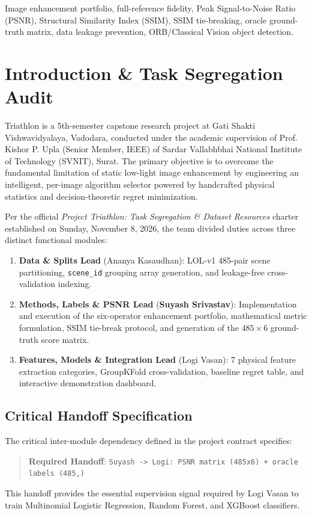 \documentclass[journal]{IEEEtran}
\begin{document}
\begin{IEEEkeywords}
Image enhancement portfolio, full-reference fidelity, Peak Signal-to-Noise Ratio (PSNR), Structural Similarity Index (SSIM), SSIM tie-breaking, oracle ground-truth matrix, data leakage prevention, ORB/Classical Vision object detection.
\end{IEEEkeywords}

\section{Introduction \& Task Segregation Audit}
 Triathlon is a 5th-semester capstone research project at Gati Shakti Vishwavidyalaya, Vadodara, conducted under the academic supervision of Prof. Kishor P. Upla (Senior Member, IEEE) of Sardar Vallabhbhai National Institute of Technology (SVNIT), Surat. The primary objective is to overcome the fundamental limitation of static low-light image enhancement by engineering an intelligent, per-image algorithm selector powered by handcrafted physical statistics and decision-theoretic regret minimization.

Per the official \textit{Project Triathlon: Task Segregation \& Dataset Resources} charter established on Sunday, November 8, 2026, the team divided duties across three distinct functional modules:
\begin{enumerate}
    \item \textbf{Data \& Splits Lead} (Ananya Kasaudhan): LOL-v1 485-pair scene partitioning, \texttt{scene\_id} grouping array generation, and leakage-free cross-validation indexing.
    \item \textbf{Methods, Labels \& PSNR Lead} (\textbf{Suyash Srivastav}): Implementation and execution of the six-operator enhancement portfolio, mathematical metric formulation, SSIM tie-break protocol, and generation of the $485 \times 6$ ground-truth score matrix.
    \item \textbf{Features, Models \& Integration Lead} (Logi Vasan): 7 physical feature extraction categories, GroupKFold cross-validation, baseline regret table, and interactive demonstration dashboard.
\end{enumerate}

\subsection{Critical Handoff Specification}
The critical inter-module dependency defined in the project contract specifies:
\begin{quote}
\centering
\textbf{Required Handoff}: \texttt{Suyash -> Logi: PSNR matrix (485x6) + oracle labels (485,)}
\end{quote}
This handoff provides the essential supervision signal required by Logi Vasan to train Multinomial Logistic Regression, Random Forest, and XGBoost classifiers.
\end{document}

